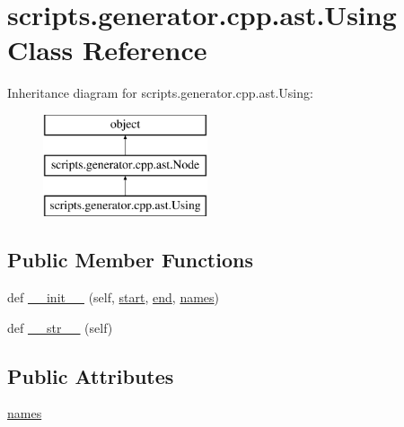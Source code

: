 \hypertarget{classscripts_1_1generator_1_1cpp_1_1ast_1_1_using}{}\section{scripts.\+generator.\+cpp.\+ast.\+Using Class Reference}
\label{classscripts_1_1generator_1_1cpp_1_1ast_1_1_using}
Inheritance diagram for scripts.\+generator.\+cpp.\+ast.\+Using\+:\begin{figure}[H]
\begin{center}
\leavevmode
\includegraphics[height=3.000000cm]{df/d69/classscripts_1_1generator_1_1cpp_1_1ast_1_1_using}
\end{center}
\end{figure}
\subsection*{Public Member Functions}
\begin{DoxyCompactItemize}
\item 
def \mbox{\hyperlink{classscripts_1_1generator_1_1cpp_1_1ast_1_1_using_a7ead335f3e62b77cd974d5e44bd29b0a}{\+\_\+\+\_\+init\+\_\+\+\_\+}} (self, \mbox{\hyperlink{classscripts_1_1generator_1_1cpp_1_1ast_1_1_node_a27ce0a583baee598b75ac6dd21f8575b}{start}}, \mbox{\hyperlink{classscripts_1_1generator_1_1cpp_1_1ast_1_1_node_a8e3394f9dd405352610ff9be4f284e2c}{end}}, \mbox{\hyperlink{classscripts_1_1generator_1_1cpp_1_1ast_1_1_using_a015eb788dd1af8fb41d2c92610916632}{names}})
\item 
def \mbox{\hyperlink{classscripts_1_1generator_1_1cpp_1_1ast_1_1_using_ae1ceff04949a229494e2f53dd644aba2}{\+\_\+\+\_\+str\+\_\+\+\_\+}} (self)
\end{DoxyCompactItemize}
\subsection*{Public Attributes}
\begin{DoxyCompactItemize}
\item 
\mbox{\hyperlink{classscripts_1_1generator_1_1cpp_1_1ast_1_1_using_a015eb788dd1af8fb41d2c92610916632}{names}}
\end{DoxyCompactItemize}


